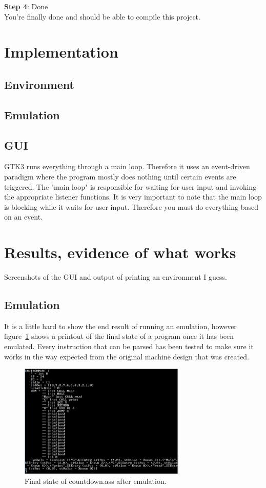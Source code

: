 \documentclass[10point]{article}
\begin{document}
\noindent \textbf{Step 4}: Done \\
You're finally done and should be able to compile this project.

\section{Implementation}
\subsection{Environment}


\subsection{Emulation}


\subsection{GUI}
GTK3 runs everything through a main loop.  Therefore it uses an event-driven paradigm where the program mostly does nothing until certain events are triggered.  The "main loop" is responsible for waiting for user input and invoking the appropriate listener functions.  It is very important to note that the main loop is blocking while it waits for user input.  Therefore you must do everything based on an event.

\section{Results, evidence of what works}
Screenshots of the GUI and output of printing an environment I guess.

\subsection{Emulation}
It is a little hard to show the end result of running an emulation, however figure~\ref{fig:EmulationResult} shows a printout of the final state of a program once it has been emulated. Every instruction that can be parsed has been tested to make sure it works in the way expected from the original machine design that was created.

\begin{figure}[h]
    \centering
    \includegraphics[width=300px]{EmulationResult}
    \caption{Final state of countdown.ass after emulation.}
    \label{fig:EmulationResult}
\end{figure}
\end{document}
